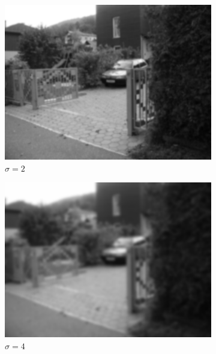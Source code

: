 \documentclass[thesis.tex]{subfiles}
\begin{document}
\begin{figure}[p]
\begin{subfigure}[t]{0.3\textwidth}
		\includegraphics[width=\textwidth]{img/scaleSpaceTheory_2.png}
		\caption{$\sigma = 2$}
		\label{fig:scaleSpaceExample2}
	\end{subfigure}
	\begin{subfigure}[t]{0.3\textwidth}
		\includegraphics[width=\textwidth]{img/scaleSpaceTheory_4.png}
		\caption{$\sigma = 4$}
		\label{fig:scaleSpaceExample4}
	\end{subfigure}
	\begin{subfigure}[t]{0.3\textwidth}

\end{subfigure}
\end{figure}
\end{document}
